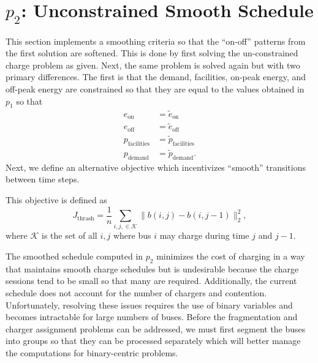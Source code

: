 \section{$p_2$: Unconstrained Smooth Schedule \label{sec:unconstrainedSmoothSchedule}} 
\par This section implements a smoothing criteria so that the ``on-off'' patterns from the first solution are softened. This is done by first solving the un-constrained charge problem as given. Next, the same problem is solved again but with two primary differences. The first is that the demand, facilities, on-peak energy, and off-peak energy are constrained so that they are equal to the values obtained in $p_1$ so that
\begin{equation}\label{eqn:unconstrainedSmooth:equivalence}\begin{aligned}
	e_{\text{on}} &= \tilde{e}_{\text{on}} \\
	e_{\text{off}} &= \tilde{e}_{\text{off}} \\
	p_{\text{facilities}} &= \tilde{p}_{\text{facilities}} \\
	p_{\text{demand}} &= \tilde{p}_{\text{demand}}.
\end{aligned}\end{equation}
Next, we define an alternative objective which incentivizes ``smooth'' transitions between time steps. 
\par This objective is defined as
\begin{equation}\label{eqn:objective:smooth}
	J_{\text{thrash}} = \frac{1}{n}\sum_{i,j, \in \mathcal{K}}\lVert b(i,j) - b(i,j-1) \rVert^2_2,
\end{equation}
where $\mathcal{K}$ is the set of all $i,j$ where bus $i$ may charge during time $j$ and $j - 1$.
\par The smoothed schedule computed in $p_2$ minimizes the cost of charging in a way that maintains smooth charge schedules but is undesirable because the charge sessions tend to be small so that many are required. Additionally, the current schedule does not account for the number of chargers and contention. Unfortunately, resolving these issues requires the use of binary variables and becomes intractable for large numbers of buses. Before the fragmentation and charger assignment problems can be addressed, we must first segment the buses into groups so that they can be processed separately which will better manage the computations for binary-centric problems.
\\[0.1in]  

